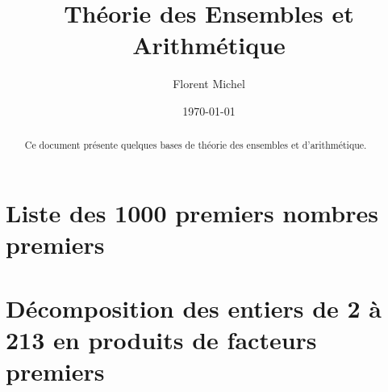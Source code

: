 
\usepackage{splitidx}
\newcommand{\aindex}[1]{#1\index{#1}} %
\makeindex
{}
 
\title{Théorie des Ensembles et Arithmétique}
\date{\today}
\author{%
Florent Michel \\ 
\Fstar}

\newcommand{\inbox}[1]{\begin{tikzpicture}[baseline=-0.7ex, inner sep=0.5ex] \node[draw] {#1\vphantom{0123456789}}; \end{tikzpicture}}

 
\date{}
\maketitle 
\begin{abstract}
Ce document présente quelques bases de théorie des ensembles et d'arithmétique.
\end{abstract}
\bigskip
\renewcommand{\contentsname}{Table des matières}
\tableofcontents 

\clearpage



\clearpage



\clearpage



\clearpage

\appendix



\clearpage

\section{Liste des 1000 premiers nombres premiers} 

\noindent\textsf{}

\clearpage

\section{Décomposition des entiers de 2 à 213 en produits de facteurs premiers}

